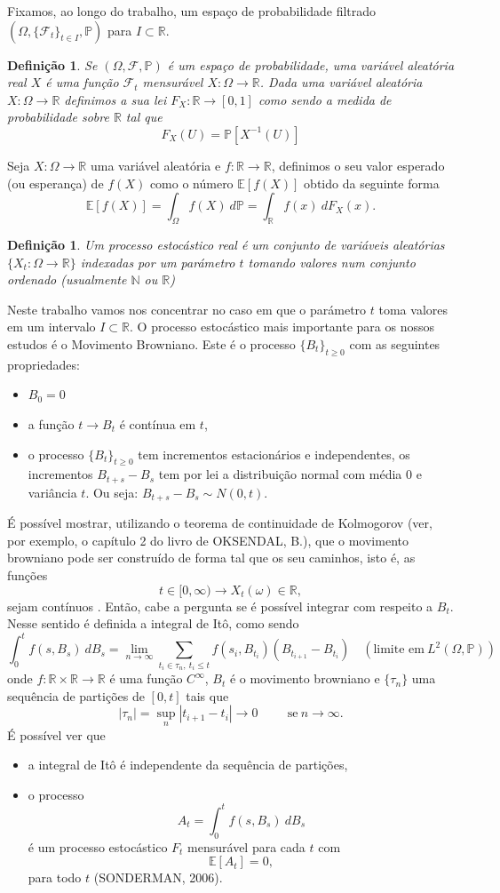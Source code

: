 \documentclass[12pt]{article}
\newtheorem{defn}[teo]{Definição}
\newcommand{\mP }{\mathbb{P}}
\newcommand{\me}{\mathbb{E}}
\newcommand{\mr }{ \mathbb{R}}
\begin{document}
Fixamos, ao longo do trabalho, um espaço de probabilidade filtrado $(\Omega,\{\mathcal{F}_t\}_{t\in I},\mP)$ para $I\subset \mr$.
\begin{defn}
Se $(\Omega,\mathcal{F},\mP)$ é um espaço de probabilidade, uma variável aleatória real $X$ é uma função $\mathcal{F}_t$ mensurável $X:\Omega\rightarrow \mr$. Dada uma variável aleatória $X:\Omega\rightarrow \mr$ definimos a sua lei $F_X:\mr\rightarrow [0,1]$ como sendo a medida de probabilidade sobre $\mr$ tal que 
\[
F_X(U)=\mP[X^{-1}(U)]
\]
\end{defn}

Seja $X:\Omega\rightarrow \mr$ uma variável aleatória  e $f:\mr\rightarrow \mr$, definimos o seu valor esperado  (ou esperança) de $f(X)$ como o número $\me[f(X)]$ obtido da seguinte forma
\[
\me[f(X)]=\int_\Omega f(X)~d\mP=\int_\mr f(x)~dF_X(x).
\]


\begin{defn}  
Um processo estocástico real é um conjunto de variáveis aleatórias $\{X_t:\Omega\rightarrow \mr\}$ indexadas por um  parámetro $t$ tomando valores num conjunto ordenado (usualmente $\mathbb{N}$ ou $\mr$)
\end{defn}
Neste trabalho vamos nos concentrar no caso em que o parámetro $t$ toma valores em um intervalo $I\subset \mr$. O processo estocástico mais importante para os nossos estudos é o Movimento Browniano. Este é o processo $\{B_t\}_{t \geq 0}$ com as seguintes propriedades:  
\begin{itemize}
\item $B_0 = 0$
\item a função $t \rightarrow B_t$ é contínua em $t$,
\item o processo $\{B_t\}_{t \geq 0}$ tem incrementos estacionários e independentes, os incrementos $B_{t+s}-B_s$ tem por lei a distribuição normal com média $0$ e variância $t$. Ou seja: $B_{t+s}-B_s \sim N(0,t)$.
\end{itemize}
\'E possível mostrar, utilizando o teorema de continuidade de Kolmogorov (ver, por exemplo, o capítulo 2 do livro de OKSENDAL, B.), que o movimento browniano pode ser construído de forma tal que os seu caminhos, isto é, as funções 
\[t\in[0,\infty)\rightarrow X_t(\omega)\in  \mr,\] sejam contínuos . Então, cabe a pergunta se é possível integrar com respeito a $B_t$. Nesse sentido é definida a integral de Itô, como sendo 
\[
\int_0^tf(s,B_s)~dB_s=\lim_{n\rightarrow\infty}\sum_{t_i\in \tau_n,~t_i\leq t}f(s_i,B_{t_i})(B_{t_{i+1}}-B_{t_i})\quad(\textrm{limite em}~L^2(\Omega,\mP))
\]onde  $f:\mr\times\mr\rightarrow \mr$ é uma função $C^\infty$, $B_t$ é o movimento browniano
e $\{\tau_n\}$ uma sequ\^encia de parti\c{c}\~oes de $[0,t]$  tais que 
\[
 |\tau_n|=\sup_n|t_{i+1}-t_i|\rightarrow 0\hspace{1cm}\textrm{se}~n\rightarrow\infty.
\]
É possível ver que 
\begin{itemize}
\item a integral de Itô é independente da sequência de partições,
\item  o processo \[
A_t=\int_0^tf(s,B_s)~dB_s
\]
é um processo estocástico $F_t$ mensurável para cada $t$  com 
\[
\me\left[A_t\right]=0,
\]
para todo $t$ (SONDERMAN, 2006).
\end{itemize}
\end{document}
